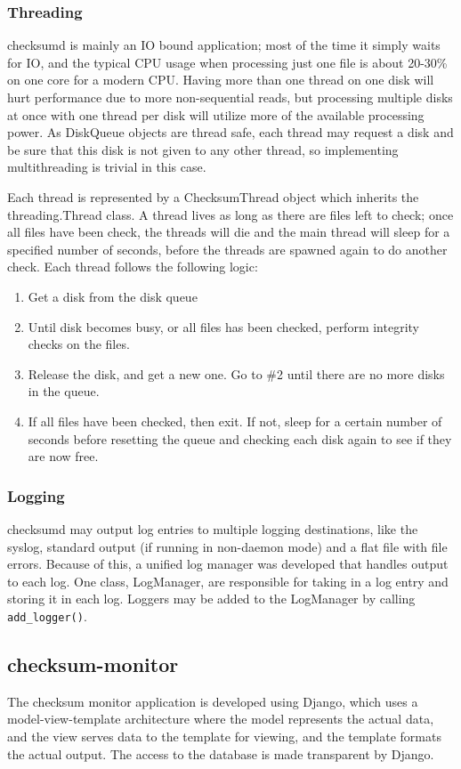 \subsubsection{Threading}
checksumd is mainly an IO bound application; most of the time it simply waits for IO, and the typical CPU usage when processing just one file is about 20-30\% on one core for a modern CPU. Having more than one thread on one disk will hurt performance due to more non-sequential reads, but processing multiple disks at once with one thread per disk will utilize more of the available processing power. As DiskQueue objects are thread safe, each thread may request a disk and be sure that this disk is not given to any other thread, so implementing multithreading is trivial in this case.

Each thread is represented by a ChecksumThread object which inherits the threading.Thread class. A thread lives as long as there are files left to check; once all files have been check, the threads will die and the main thread will sleep for a specified number of seconds, before the threads are spawned again to do another check. Each thread follows the following logic:
\begin{enumerate}
\item Get a disk from the disk queue
\item Until disk becomes busy, or all files has been checked, perform integrity checks on the files.
\item Release the disk, and get a new one. Go to \#2 until there are no more disks in the queue.
\item If all files have been checked, then exit. If not, sleep for a certain number of seconds before resetting the queue and checking each disk again to see if they are now free.
\end{enumerate}

\subsubsection{Logging}
checksumd may output log entries to multiple logging destinations, like the syslog, standard output (if running in non-daemon mode) and a flat file with file errors. Because of this, a unified log manager was developed that handles output to each log. One class, LogManager, are responsible for taking in a log entry and storing it in each log. Loggers may be added to the LogManager by calling {\tt add\_logger()}.

\subsection{checksum-monitor}
The checksum monitor application is developed using Django, which uses a model-view-template architecture where the model represents the actual data, and the view serves data to the template for viewing, and the template formats the actual output. The access to the database is made transparent by Django. 

